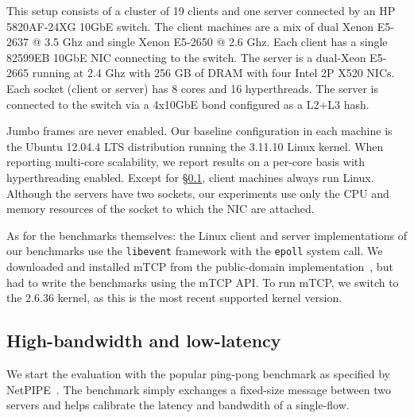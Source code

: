  This setup consists of a cluster of 19
clients and one server connected by an HP 5820AF-24XG 10GbE switch.
The client machines are a mix of dual Xenon E5-2637 @ 3.5 Ghz
and single Xenon E5-2650 @ 2.6 Ghz.  Each client has a single
82599EB 10GbE NIC connecting to the switch.  The server is a dual-Xeon
E5-2665 running at 2.4 Ghz with 256 GB of DRAM with four Intel 2P X520
NICs.  Each socket (client or server) has 8 cores and 16 hyperthreads.
The server is connected to the switch via a 4x10GbE bond configured as a L2+L3 hash.

 Jumbo frames are never enabled.  Our
baseline configuration in each machine is the Ubuntu 12.04.4 LTS
distribution running the 3.11.10 Linux kernel.  When reporting
multi-core scalability, we report results on a per-core basis with
hyperthreading enabled.  Except for \S\ref{sec:eval:netpipe}, client
machines always run Linux. Although the servers have two sockets, our
experiments use only the CPU and memory resources of the socket to
which the NIC are attached.



%




As for the benchmarks themselves: the Linux client and server
implementations of our benchmarks use the \texttt{libevent} framework
with the \texttt{epoll} system call.  We downloaded and installed mTCP
from the public-domain implementation~\cite{url:mtcp}, but had to
write the benchmarks using the mTCP API.  To run mTCP, we switch to the
2.6.36 kernel, as this is the most recent supported kernel version.

\subsection{High-bandwidth and low-latency}
\label{sec:eval:netpipe}


We start the evaluation with the popular ping-pong benchmark as
specified by NetPIPE~\cite{snell1996netpipe}. The benchmark simply
exchanges a fixed-size message between two servers and helps
calibrate the latency and bandwdith of a single-flow.



